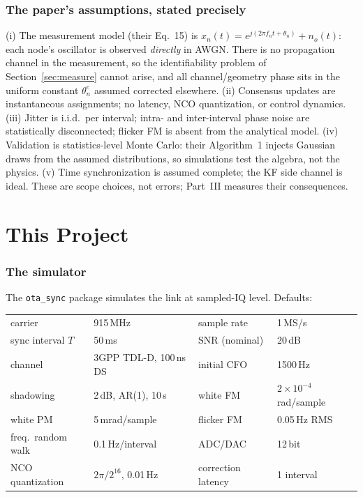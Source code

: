 \documentclass[10pt]{article}
\newcommand{\code}[1]{\texttt{#1}}
\begin{document}
\section{The paper's assumptions, stated precisely}
\label{sec:assess}
(i) The measurement model (their Eq.~15) is
$x_n(t)=e^{j(2\pi f_nt+\theta_n)}+n_o(t)$: each node's oscillator is
observed \emph{directly} in AWGN. There is no propagation channel in the
measurement, so the identifiability problem of
Section~\ref{sec:measure} cannot arise, and all channel/geometry phase
sits in the uniform constant $\theta^e_n$ assumed corrected elsewhere.
(ii) Consensus updates are instantaneous assignments; no latency, NCO
quantization, or control dynamics. (iii) Jitter is i.i.d.\ per interval;
intra- and inter-interval phase noise are statistically disconnected;
flicker FM is absent from the analytical model. (iv) Validation is
statistics-level Monte Carlo: their Algorithm~1 injects Gaussian draws
from the assumed distributions, so simulations test the algebra, not the
physics. (v) Time synchronization is assumed complete; the KF side
channel is ideal. These are scope choices, not errors; Part~III measures
their consequences.

\part{This Project}

\section{The simulator}
\label{sec:sim}
The \code{ota\_sync} package simulates the link at sampled-IQ level.
Defaults:

\begin{center}
\begin{tabular}{llll}
\toprule
carrier & 915\,MHz & sample rate & 1\,MS/s\\
sync interval $T$ & 50\,ms & SNR (nominal) & 20\,dB\\
channel & 3GPP TDL-D, 100\,ns DS & initial CFO & 1500\,Hz\\
shadowing & 2\,dB, AR(1), 10\,s & white FM & $2{\times}10^{-4}$\,rad/sample\\
white PM & 5\,mrad/sample & flicker FM & 0.05\,Hz RMS\\
freq.\ random walk & 0.1\,Hz/interval & ADC/DAC & 12\,bit\\
NCO quantization & $2\pi/2^{16}$, 0.01\,Hz & correction latency & 1 interval\\
\bottomrule
\end{tabular}
\end{center}
\end{document}
